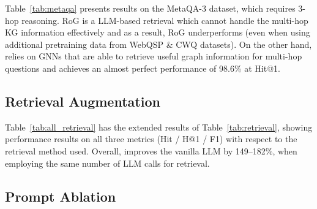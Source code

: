 Table~\ref{tab:metaqa} presents results on the MetaQA-3 dataset, which requires 3-hop reasoning. RoG is a LLM-based retrieval which cannot handle the multi-hop KG information effectively and as a result, RoG underperforms (even when using additional pretraining data from WebQSP \& CWQ datasets). On the other hand, \grag relies on GNNs that are able to retrieve useful graph information for multi-hop questions and achieves an almost perfect performance of 98.6\% at Hit@1. 




\subsection{Retrieval Augmentation}



Table~\ref{tab:all_retrieval} has the extended results of Table~\ref{tab:retrieval}, showing performance  results on all three metrics (Hit / H@1 / F1) with respect to the retrieval method used. Overall, \grag improves the vanilla LLM by 149--182\%, when employing the same number of LLM calls for retrieval.

\subsection{Prompt Ablation}

